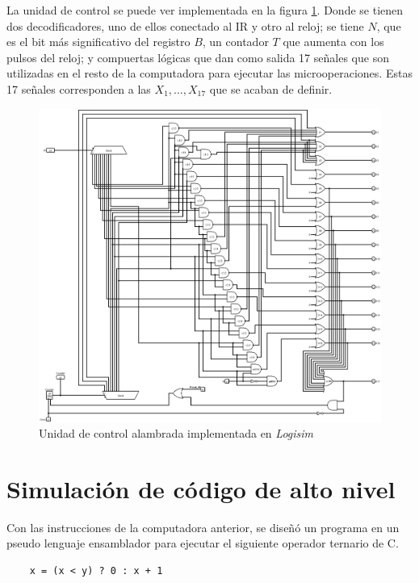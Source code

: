 \documentclass{article}
\begin{document}
La unidad de control se puede ver implementada en la figura \ref{fig:control_logisim}. Donde se tienen dos decodificadores, uno de ellos conectado al IR y otro al reloj; se tiene $N$, que es el bit más significativo del registro $B$, un contador $T$ que aumenta con los pulsos del reloj; y compuertas lógicas que dan como salida 17 señales que son utilizadas en el resto de la computadora para ejecutar las microoperaciones. Estas 17 señales corresponden a las $X_1, \hdots, X_{17}$ que se acaban de definir.

\begin{figure}[h]
    \centering
    \includegraphics[width=\textwidth]{img/control.png}
    \caption{Unidad de control alambrada implementada en \textit{Logisim}}
    \label{fig:control_logisim}
\end{figure}

\section{Simulación de código de alto nivel}

Con las instrucciones de la computadora anterior, se diseñó un programa en un pseudo lenguaje ensamblador para ejecutar el siguiente operador ternario de C.

\begin{verbatim}
    x = (x < y) ? 0 : x + 1    
\end{verbatim}
\end{document}
